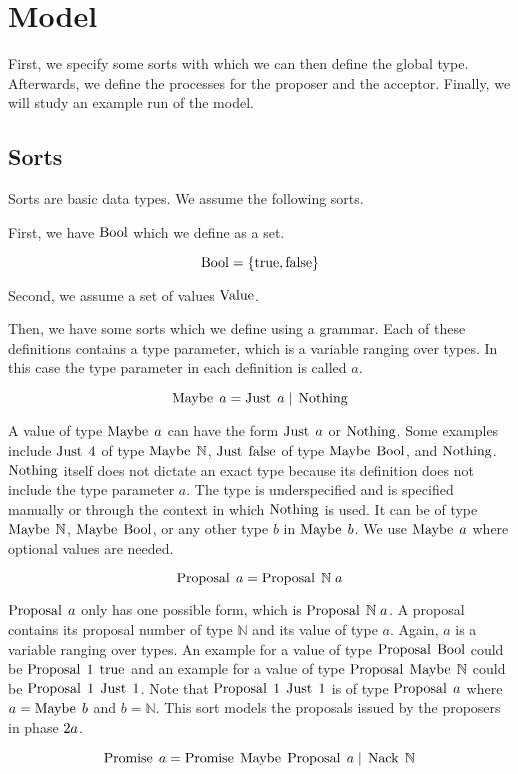 \chapter{Model}
First, we specify some sorts with which we can then define the global type.
Afterwards, we define the processes for the proposer and the acceptor.
Finally, we will study an example run of the model.

\section{Sorts}
Sorts are basic data types.
We assume the following sorts.

First, we have $\operatorname{Bool}$ which we define as a set.

\[\operatorname{Bool} = \left\{\operatorname{true}, \operatorname{false}\right\}\]

Second, we assume a set of values $\operatorname{Value}$.

Then, we have some sorts which we define using a grammar.
Each of these definitions contains a type parameter, which is a variable ranging over types.
In this case the type parameter in each definition is called $a$.

\[\operatorname{Maybe}\; a = \operatorname{Just}\; a \; | \; \operatorname{Nothing}\]

A value of type $\operatorname{Maybe}\; a$ can have the form $\operatorname{Just}\; a$ or $\operatorname{Nothing}$.
Some examples include $\operatorname{Just}\; 4$ of type $\operatorname{Maybe}\; \mathbb{N}$, $\operatorname{Just}\; \operatorname{false}$ of type $\operatorname{Maybe}\; \operatorname{Bool}$, and $\operatorname{Nothing}$.
$\operatorname{Nothing}$ itself does not dictate an exact type because its definition does not include the type parameter $a$.
The type is underspecified and is specified manually or through the context in which $\operatorname{Nothing}$ is used.
It can be of type $\operatorname{Maybe}\; \mathbb{N}$, $\operatorname{Maybe}\; \operatorname{Bool}$, or any other type $b$ in $\operatorname{Maybe}\; b$.
We use $\operatorname{Maybe}\; a$ where optional values are needed.

\[\operatorname{Proposal}\; a = \operatorname{Proposal}\; \mathbb{N}\; a\]

$\operatorname{Proposal}\; a$ only has one possible form, which is $\operatorname{Proposal}\; \mathbb{N}\; a$.
A proposal contains its proposal number of type $\mathbb{N}$ and its value of type $a$.
Again, $a$ is a variable ranging over types.
An example for a value of type $\operatorname{Proposal}\; \operatorname{Bool}$ could be $\operatorname{Proposal}\; 1\; \operatorname{true}$ and an example for a value of type $\operatorname{Proposal}\; \operatorname{Maybe}\; \mathbb{N}$ could be $\operatorname{Proposal}\; 1\; \operatorname{Just}\; 1$.
Note that $\operatorname{Proposal}\; 1\; \operatorname{Just}\; 1$ is of type $\operatorname{Proposal}\; a$ where $a = \operatorname{Maybe}\; b$ and $b = \mathbb{N}$.
This sort models the proposals issued by the proposers in phase $2a$.

\[\operatorname{Promise}\; a = \operatorname{Promise}\; \operatorname{Maybe}\; \operatorname{Proposal}\; a \; | \; \operatorname{Nack}\; \mathbb{N}\]

